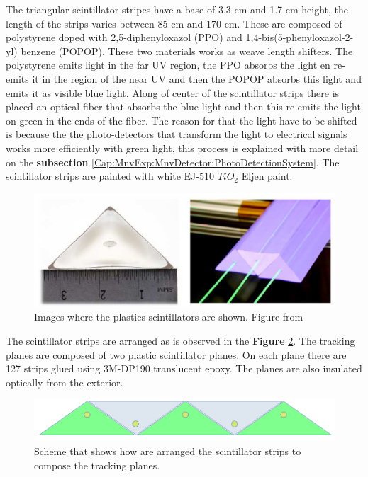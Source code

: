 The triangular scintillator stripes have a base of 3.3 cm and 1.7 cm height, the length of the strips varies between 85 cm and 170 cm. These are composed of polystyrene doped with  2,5-diphenyloxazol (PPO) and 1,4-bis(5-phenyloxazol-2-yl) benzene (POPOP). These two materials works as weave length shifters. The polystyrene emits light in the far UV region, the PPO absorbs the light en re-emits it in the region of the near UV and then the POPOP absorbs this light and emits it as visible blue light. Along of center of the scintillator strips there is placed an optical fiber that absorbs the blue light and then this re-emits the light on green in the ends of the fiber. The reason for that the light have to be shifted is because the the photo-detectors that transform the light to electrical signals works more efficiently with green light, this process is explained with more detail on the \textbf{subsection} \ref{Cap:MnvExp:MnvDetector:PhotoDetectionSystem}. The scintillator strips are painted with white EJ-510 $TiO_2$ Eljen paint\cite{StripsPaint}. 


\begin{figure}[!htb]
\centering
\includegraphics[scale=0.3]{Figures/Chapter2/ScintStripes.png}

        \caption{Images where the plastics scintillators are shown. Figure from \cite{MINERvA}} 
\label{fig:MnvExp:MnvDetector:TriangularStripes}
\end{figure}

The scintillator strips are arranged as is observed in the \textbf{Figure} \ref{fig:MnvExp:MnvDetector:StripsArrange}. The tracking planes are composed of two plastic scintillator planes. On each plane there are 127 strips glued using 3M-DP190 translucent epoxy. The planes are also insulated optically from the exterior. 

\begin{figure}[!htb]
\centering
\includegraphics[scale=0.3]{Figures/Chapter2/stripsArrange.png}

        \caption{Scheme that shows how are arranged the scintillator strips to compose the tracking planes.} 
\label{fig:MnvExp:MnvDetector:StripsArrange}
\end{figure}

